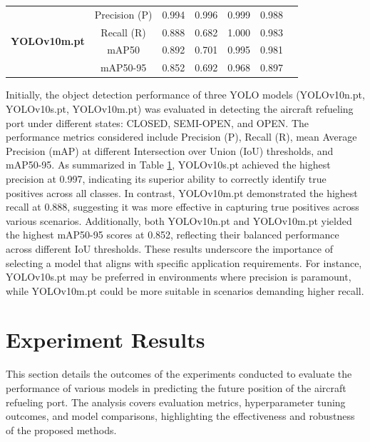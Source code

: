 \documentclass[12pt,oneside]{book} %
\begin{document}
\begin{table}[h!]
\begin{adjustbox}{max width=\textwidth}
\begin{tabular}{lcccccc}
            \multirow{4}{*}{\textbf{YOLOv10m.pt}} & Precision (P)   & 0.994        & 0.996                       & 0.999                          & 0.988                     \\
                                                  & Recall (R)      & 0.888        & 0.682                       & 1.000                          & 0.983                     \\
                                                  & mAP50           & 0.892        & 0.701                       & 0.995                          & 0.981                     \\
                                                  & mAP50-95        & 0.852        & 0.692                       & 0.968                          & 0.897                     \\
            \bottomrule
        \end{tabular}
    \end{adjustbox}
    \label{tab:comparison}
\end{table}

Initially, the object detection performance of three YOLO models (YOLOv10n.pt,
YOLOv10s.pt, YOLOv10m.pt) was evaluated in detecting the aircraft refueling
port under different states: CLOSED, SEMI-OPEN, and OPEN. The performance
metrics considered include Precision (P), Recall (R), mean Average Precision
(mAP) at different Intersection over Union (IoU) thresholds, and mAP50-95. As
summarized in Table \ref{tab:comparison}, YOLOv10s.pt achieved the highest
precision at 0.997, indicating its superior ability to correctly identify true
positives across all classes. In contrast, YOLOv10m.pt demonstrated the highest
recall at 0.888, suggesting it was more effective in capturing true positives
across various scenarios. Additionally, both YOLOv10n.pt and YOLOv10m.pt
yielded the highest mAP50-95 scores at 0.852, reflecting their balanced
performance across different IoU thresholds. These results underscore the
importance of selecting a model that aligns with specific application
requirements. For instance, YOLOv10s.pt may be preferred in environments where
precision is paramount, while YOLOv10m.pt could be more suitable in scenarios
demanding higher recall.

\section{Experiment Results}
This section details the outcomes of the experiments conducted to evaluate the
performance of various models in predicting the future position of the aircraft
refueling port. The analysis covers evaluation metrics, hyperparameter tuning
outcomes, and model comparisons, highlighting the effectiveness and robustness
of the proposed methods.
\end{document}
